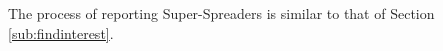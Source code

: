 {\color{reviewD}
The process of reporting Super-Spreaders is similar to that of Section \ref{sub:findinterest}.
}

